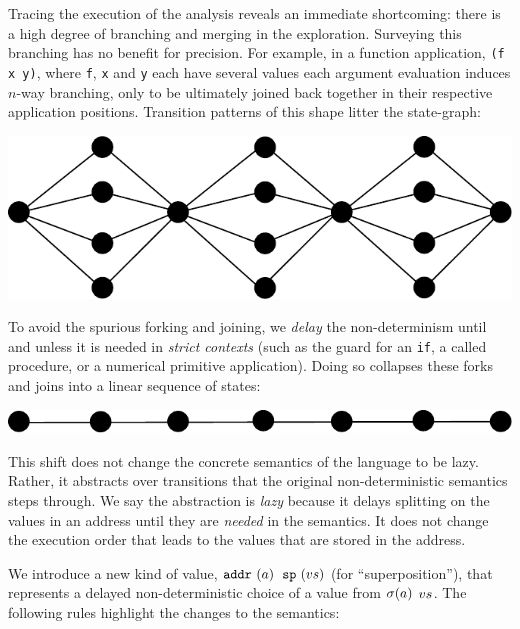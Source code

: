 \documentclass[preprint,onecolumn,9pt]{sigplanconf} %
\begin{document}
Tracing the execution of the analysis reveals an immediate shortcoming:
there is a high degree of branching and merging in the exploration.
%
Surveying this branching has no benefit for precision.
%
For example, in a function application, {\tt (f x y)},
where {\tt f}, {\tt x} and {\tt y} each have several values
each argument evaluation induces $n$-way branching, only to be ultimately joined back together in their respective
application positions.
%
Transition patterns of this shape litter the state-graph:
%
\begin{center}
\includegraphics[scale=0.3]{fanout}
\end{center}
To avoid the spurious forking and joining, we {\it delay} the non-determinism
until and unless it is needed in {\it strict contexts} (such as the guard for an
{\tt if}, a called procedure, or a numerical primitive application).
%
Doing so collapses these forks and joins into a linear sequence of states:
\begin{center}
\includegraphics[scale=0.3]{lazy}
\end{center}

This shift does not change the concrete semantics of the language to
be lazy.  Rather, it abstracts over transitions that the original
non-deterministic semantics steps through.
%
We say the abstraction is \emph{lazy} because it delays splitting on
the values in an address until they are \emph{needed} in the
semantics. It does not change the execution order that leads to the
values that are stored in the address.

We introduce a new kind of value,
\spchoice
{${\tt addr}{\ }({a})$}
{${\tt sp}{\ }({v{s}})$ (for ``superposition'')},
%
that represents a delayed non-deterministic choice of a value from
\spchoice
{$\sigma(a)$}
{$v{s}$}.
%
The following rules highlight the changes to the semantics:
\end{document}
